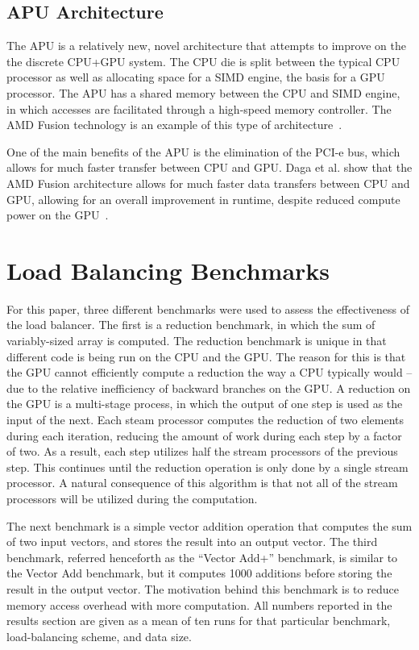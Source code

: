 \documentclass[journal]{IEEEtran}
\begin{document}
\subsection{APU Architecture}
The APU is a relatively new, novel architecture that attempts to 
improve on the the discrete CPU+GPU system.  The CPU die is split
between the typical CPU processor as well as allocating space
for a SIMD engine, the basis for a GPU processor.  The APU has a 
shared memory between the CPU and SIMD engine, in which accesses
are facilitated through a high-speed memory controller.  The AMD
Fusion technology is an example of this type of architecture~\cite{AMDFusion}.

One of the main benefits of the APU is the elimination of the PCI-e
bus, which allows for much faster transfer between CPU and GPU.  Daga et al.
show that the AMD Fusion architecture allows for much faster data transfers
between CPU and GPU, allowing for an overall improvement in runtime, despite
reduced compute power on the GPU~\cite{Daga2011}. 

\section{Load Balancing Benchmarks}

For this paper, three different benchmarks were used to assess the
effectiveness of the load balancer.  The first is a reduction benchmark,
in which the sum of variably-sized array is computed.  The reduction benchmark
is unique in that different code is being run on the CPU and the GPU.  The
reason for this is that the GPU cannot efficiently compute a reduction the way
a CPU typically would -- due to the relative inefficiency of backward branches
on the GPU.  A reduction on the GPU is a multi-stage process, in which the
output of one step is used as the input of the next.  Each steam processor
computes the reduction of two elements during each iteration, reducing the amount
of work during each step by a factor of two.  As a result, each step utilizes half
the stream processors of the previous step.  This continues until the reduction
operation is only done by a single stream processor.  A natural consequence of
this algorithm is that not all of the stream processors will be utilized during
the computation.

The next benchmark is a simple vector addition operation that computes the sum
of two input vectors, and stores the result into an output vector.  The third
benchmark, referred henceforth as the ``Vector Add+'' benchmark, is similar to
the Vector Add benchmark, but it computes 1000 additions before storing the result
in the output vector.  The motivation behind this benchmark is to reduce memory
access overhead with more computation.  All numbers reported in the results section
are given as a mean of ten runs for that particular benchmark, load-balancing scheme,
and data size.
\end{document}
